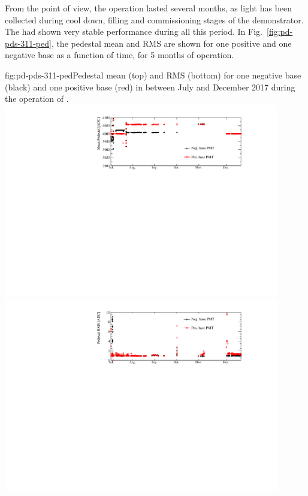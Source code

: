 From the  point of view, the  operation lasted several months, as light has been collected during cool down, filling and commissioning stages of the demonstrator.
The  had shown very stable performance during all this period. 
In Fig.~\ref{fig:pd-pds-311-ped}, the  pedestal mean and RMS are shown for one positive and one negative base  as a function of time, for \num{5} months of operation. 

\begin{dunefigure}{fig:pd-pds-311-ped}{Pedestal mean (top) and RMS (bottom) for one negative base  (black) and one positive base  (red) in between July and December 2017 during the operation of .}
\includegraphics[width=0.9\textwidth]{graphics/dppd_311_pedestal.pdf}\\
\includegraphics[width=0.9\textwidth]{graphics/dppd_311_pedestal_rms.pdf}
\end{dunefigure}

